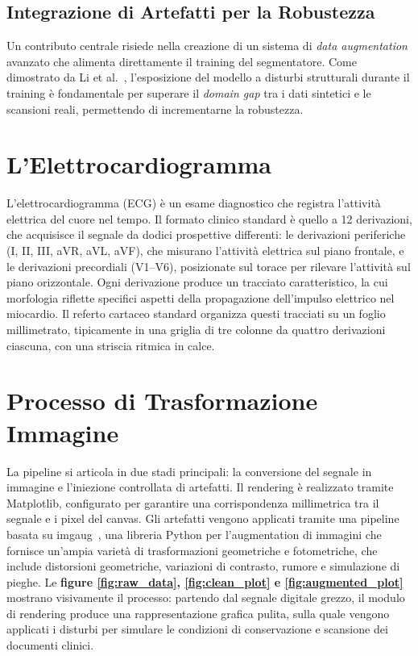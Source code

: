 \subsection{Integrazione di Artefatti per la Robustezza}
Un contributo centrale risiede nella creazione di un sistema di \textit{data augmentation} avanzato che alimenta direttamente il training del segmentatore. Come dimostrato da Li et al.~\cite{li2020deep}, l'esposizione del modello a disturbi strutturali durante il training è fondamentale per superare il \textit{domain gap} tra i dati sintetici e le scansioni reali, permettendo di incrementarne la robustezza.

\section{L'Elettrocardiogramma}
L'elettrocardiogramma (ECG) è un esame diagnostico che registra l'attività elettrica del cuore nel tempo. Il formato clinico standard è quello a 12 derivazioni, che acquisisce il segnale da dodici prospettive differenti: le derivazioni periferiche (I, II, III, aVR, aVL, aVF), che misurano l'attività elettrica sul piano frontale, e le derivazioni precordiali (V1--V6), posizionate sul torace per rilevare l'attività sul piano orizzontale. Ogni derivazione produce un tracciato caratteristico, la cui morfologia riflette specifici aspetti della propagazione dell'impulso elettrico nel miocardio. Il referto cartaceo standard organizza questi tracciati su un foglio millimetrato, tipicamente in una griglia di tre colonne da quattro derivazioni ciascuna, con una striscia ritmica in calce.

\section{Processo di Trasformazione Immagine}
La pipeline si articola in due stadi principali: la conversione del segnale in immagine e l'iniezione controllata di artefatti. Il rendering è realizzato tramite Matplotlib, configurato per garantire una corrispondenza millimetrica tra il segnale e i pixel del canvas. Gli artefatti vengono applicati tramite una pipeline basata su imgaug~\cite{imgaug}, una libreria Python per l'augmentation di immagini che fornisce un'ampia varietà di trasformazioni geometriche e fotometriche, che include distorsioni geometriche, variazioni di contrasto, rumore e simulazione di pieghe. Le \textbf{figure \ref{fig:raw_data}, \ref{fig:clean_plot} e \ref{fig:augmented_plot}} mostrano visivamente il processo: partendo dal segnale digitale grezzo, il modulo di rendering produce una rappresentazione grafica pulita, sulla quale vengono applicati i disturbi per simulare le condizioni di conservazione e scansione dei documenti clinici.

